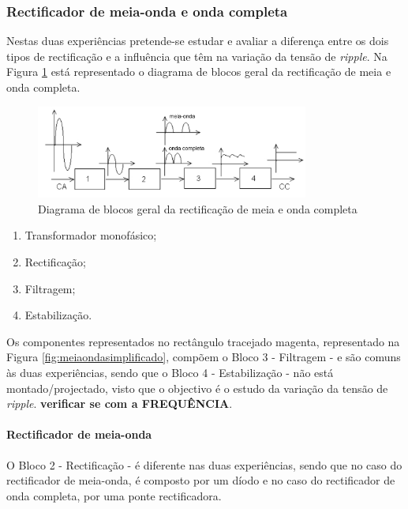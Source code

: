 \subsubsection{Rectificador de meia-onda e onda completa}
\label{sec:rectificadores}

Nestas duas experiências pretende-se estudar e avaliar a diferença entre os dois tipos de rectificação e a influência que têm na variação da tensão de \textit{ripple}.
Na Figura \ref{fig:blocosrectificacao} está representado o diagrama de blocos geral da rectificação de meia e onda completa.

\begin{figure}[hbtp]
	\centering
	\includegraphics[width=0.8\textwidth]{figures/diagramablocosrectificacao.png}
	\caption{Diagrama de blocos geral da rectificação de meia e onda completa}
	\label{fig:blocosrectificacao}
\end{figure}

\begin{enumerate}
    \item Transformador monofásico;
    \item Rectificação;
	\item Filtragem;
	\item Estabilização.
\end{enumerate}

Os componentes representados no rectângulo tracejado magenta, representado na Figura \ref{fig:meiaondasimplificado}, compõem o Bloco 3 - Filtragem - e são comuns às duas experiências, sendo que o Bloco 4 - Estabilização - não está montado/projectado, visto que o objectivo é o estudo da variação da tensão de \textit{ripple}. \textbf{verificar se com a FREQUÊNCIA}.

\paragraph{Rectificador de meia-onda}
O Bloco 2 - Rectificação - é diferente nas duas experiências, sendo que no caso do rectificador de meia-onda, é composto por um díodo e no caso do rectificador de onda completa, por uma ponte rectificadora. 

